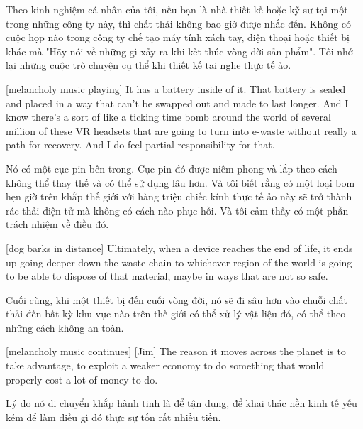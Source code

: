 \documentclass[a4paper]{article}
\begin{document}
	
	\begin{vietnamese-v2}
		[Nirav] Theo kinh nghiệm cá nhân của tôi, nếu bạn là nhà thiết kế hoặc kỹ sư tại một trong những công ty này, thì chất thải không bao giờ được nhắc đến.
		Không có cuộc họp nào trong công ty chế tạo máy tính xách tay, điện thoại hoặc thiết bị khác mà "Hãy nói về những gì xảy ra khi kết thúc vòng đời sản phẩm".
		Tôi nhớ lại những cuộc trò chuyện cụ thể khi thiết kế tai nghe thực tế ảo.
	\end{vietnamese-v2}
	
	[melancholy music playing]
	It has a battery inside of it.
	That battery is sealed and placed in a way that can't be swapped out and made to last longer.
	And I know there's a sort of like a ticking time bomb around the world of several million of these VR headsets that are going to turn into e-waste without really a path for recovery.
	And I do feel partial responsibility for that.
	
	\begin{vietnamese-v2}
		Nó có một cục pin bên trong.
		Cục pin đó được niêm phong và lắp theo cách không thể thay thế và có thể sử dụng lâu hơn.
		Và tôi biết rằng có một loại bom hẹn giờ trên khắp thế giới với hàng triệu chiếc kính thực tế ảo này sẽ trở thành rác thải điện tử mà không có cách nào phục hồi.
		Và tôi cảm thấy có một phần trách nhiệm về điều đó.
	\end{vietnamese-v2}
	
	[dog barks in distance]
	Ultimately, when a device reaches the end of life, it ends up going deeper down the waste chain to whichever region of the world is going to be able to dispose of that material, maybe in ways that are not so safe.
	
	\begin{vietnamese-v2}
		Cuối cùng, khi một thiết bị đến cuối vòng đời, nó sẽ đi sâu hơn vào chuỗi chất thải đến bất kỳ khu vực nào trên thế giới có thể xử lý vật liệu đó, có thể theo những cách không an toàn.
	\end{vietnamese-v2}
	
	[melancholy music continues]
	[Jim] The reason it moves across the planet is to take advantage, to exploit a weaker economy to do something that would properly cost a lot of money to do.
	
	\begin{vietnamese-v2}
		 Lý do nó di chuyển khắp hành tinh là để tận dụng, để khai thác nền kinh tế yếu kém để làm điều gì đó thực sự tốn rất nhiều tiền.
	\end{vietnamese-v2}
	
\end{document}
